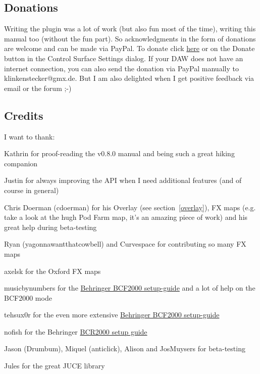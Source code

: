 \subsection{Donations}

Writing the plugin was a lot of work (but also fun most of the time), writing this
manual too (without the fun part). So acknowledgments in the form of donations are
welcome and can be made via PayPal. To donate click
\href{https://www.paypal.com/cgi-bin/webscr?cmd=_s-xclick&hosted_button_id=LR54GZHGL6VHA}{here}
or on the Donate button in the Control Surface
Settings dialog. If your DAW does not have an internet connection, you can also
send the donation via PayPal manually to klinkenstecker@gmx.de. But I am also
delighted when I get positive feedback via email or the \reaper forum ;-)


\subsection{Credits}
I want to thank:
\begin{compactitem}
\item Kathrin for proof-reading the v0.8.0 manual and being such a great
  hiking companion
\item Justin for always improving the \reaper API when I need
  additional features (and of course \reaper in general)
\item Chris Doerman (cdoerman) for his Overlay (see
  section~\ref{overlay}), FX maps (e.g. take a look at the hugh Pod
  Farm map, it's an amazing piece of work) and his great help during
  beta-testing
\item Ryan (yagonnawantthatcowbell) and Curvespace for contributing so
  many FX maps
\item axelsk for the Oxford FX maps
\item musicbynumbers for the
  \href{http://forum.cockos.com/showpost.php?p=473466&postcount=127}{Behringer
    BCF2000 setup-guide} and a lot of help on the BCF2000 mode
\item tehsux0r for the even more extensive
  \href{http://forum.cockos.com/showthread.php?t=117909}{Behringer
    BCF2000 setup-guide}
\item nofish for the Behringer
  \href{http://forum.cockos.com/showthread.php?t=60110}{BCR2000
    setup guide}
\item Jason (Drumbum), Miquel (anticlick), Alison and JosMuysers for
beta-testing
\item Jules for the great JUCE library
\end{compactitem}

